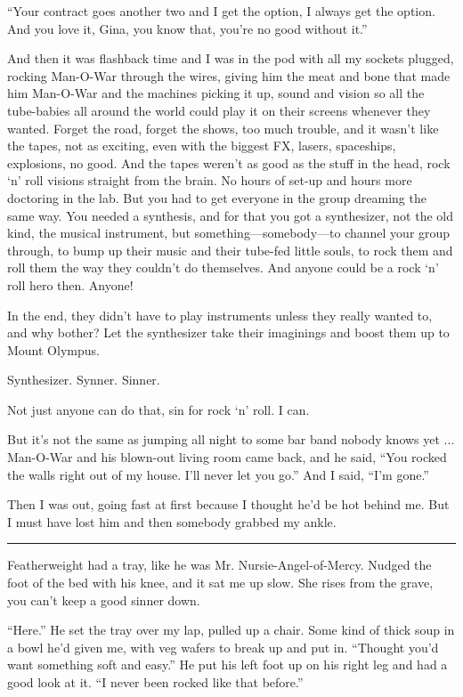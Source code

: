 ``Your contract goes another two and I get the option, I always get the option. And you love it, Gina, you know that, you're no good without it.''

And then it was flashback time and I was in the pod with all my sockets plugged, rocking Man-O-War through the wires, giving him the meat and bone that made him Man-O-War and the machines picking it up, sound and vision so all the tube-babies all around the world could play it on their screens whenever they wanted. Forget the road, forget the shows, too much trouble, and it wasn't like the tapes, not as exciting, even with the biggest FX, lasers, spaceships, explosions, no good. And the tapes weren't as good as the stuff in the head, rock `n' roll visions straight from the brain. No hours of set-up and hours more doctoring in the lab. But you had to get everyone in the group dreaming the same way. You needed a synthesis, and for that you got a synthesizer, not the old kind, the musical instrument, but something—somebody—to channel your group through, to bump up their music and their tube-fed little souls, to rock them and roll them the way they couldn't do themselves. And anyone could be a rock `n' roll hero then. Anyone!

In the end, they didn't have to play instruments unless they really wanted to, and why bother? Let the synthesizer take their imaginings and boost them up to Mount Olympus.

Synthesizer. Synner. Sinner.

Not just anyone can do that, sin for rock `n' roll. I can.

But it's not the same as jumping all night to some bar band nobody knows yet ... Man-O-War and his blown-out living room came back, and he said, ``You rocked the walls right out of my house. I'll never let you go.''
And I said, ``I'm gone.''

Then I was out, going fast at first because I thought he'd be hot behind me. But I must have lost him and then somebody grabbed my ankle.

\fancybreak{* * *}

Featherweight had a tray, like he was Mr. Nursie-Angel-of-Mercy. Nudged the foot of the bed with his knee, and it sat me up slow. She rises from the grave, you can't keep a good sinner down.

``Here.'' He set the tray over my lap, pulled up a chair. Some kind of thick soup in a bowl he'd given me, with veg wafers to break up and put in. ``Thought you'd want something soft and easy.'' He put his left foot up on his right leg and had a good look at it. ``I never been rocked like that before.''

